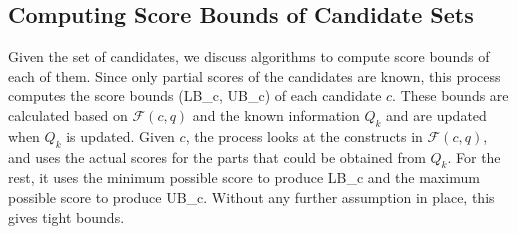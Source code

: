 \begin{comment}
Initially, we may exclude a subset of these candidates that are assuredly not the query answer, based on prior knowledge on the context of the problem. 

\end{example}



\end{comment}


\subsection{Computing Score Bounds of Candidate Sets}
\label{bound_computation}

Given the set of candidates,  we discuss algorithms to compute score bounds of each of them. Since only partial scores of the candidates are known, this process computes the score bounds (LB\_c, UB\_c) of each candidate $c$. These bounds are calculated based on $\mathcal{F}(c, q)$ and the known information $Q_k$ and are updated when $Q_k$ is updated. Given $c$, the process looks at the constructs in $\mathcal{F}(c, q)$, and uses the actual scores for the parts that could be obtained from $Q_k$. For the rest, it uses the minimum possible score to produce LB\_c and the maximum possible score to produce UB\_c. Without any further assumption in place, this gives tight bounds.

